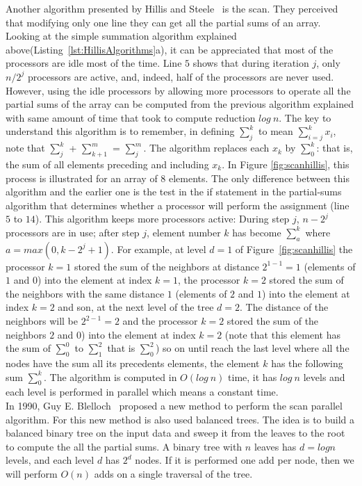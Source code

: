 \documentclass[Ingles]{ic-tese-v1}
\newcommand{\rfig}[1]{Figure~\ref{fig:#1}}
\newcommand{\rlsts}[2]{Listing~\ref{lst:#1}{#2}}
\begin{document}
Another algorithm presented by Hillis and Steele~\cite{dataparallel} is the scan. They perceived that modifying only one line they can get all the partial sums of an array.
Looking at the simple summation algorithm explained above(\rlsts{HillisAlgorithms}{a}), it can be appreciated that most of the processors are idle most of the time. Line $5$ shows that during iteration $j$, only $n/2^{j}$ processors are active, and, indeed, half of the processors are never used. However, using the idle processors by allowing more processors to operate all the partial sums of the array can be computed from the previous algorithm explained with same amount of time that took to compute reduction $log\ n$. The key to understand this algorithm is to remember, in defining $\sum_{j}^{k}$ to mean $\sum_{i=j}^{k}x_{i}$, note that $\sum_{j}^{k}$ + $\sum_{k+1}^{m}$ = $\sum_{j}^{m}$. The algorithm replaces each $x_{k}$ by $\sum_{0}^{k}$: that is, the sum of all elements preceding and including $x_{k}$. In Figure \ref{fig:scanhillis}, this process is illustrated for an array of 8 elements.
The only difference between this algorithm and the earlier one is the test in the if statement in the partial-sums algorithm that determines whether a processor will perform the assignment (line $5$ to $14$). This algorithm keeps more processors active: During step $j$, $n - 2^{j}$ processors are in use; after step $j$, element number $k$ has become $\sum_{a}^{k}$ where $a = max(0, k - 2^{j} + 1)$. For  example, at  level $d  = 1$  of \rfig{scanhillis} the processor $k = 1$ stored the sum of the neighbors at distance $2^{1-1} = 1$ (elements of $1$ and $0$) into the element at index $k = 1$, the processor $k = 2$ stored the sum of the neighbors with the same distance $1$ (elements of $2$ and $1$) into the element at index $k = 2$ and son, at the  next level of  the tree $d = 2$. The distance of the neighbors will be $2^{2-1} = 2$ and the processor $k = 2$ stored the sum of the neighbors $2$ and $0$) into the element at index $k = 2$ (note that this element has the sum of $\sum_{0}^{0}$ to $\sum_{1}^{2}$ that is $\sum_{0}^{2}$) so on until reach the last level where all the nodes have the sum all its precedents elements, the element $k$ has the following sum $\sum_{0}^{k}$. The algorithm is computed in $O(log\ n)$ time, it has $log\ n$ levels and each level is performed in parallel which means a constant time.\\
In 1990, Guy  E. Blelloch~\cite{ScanAsPrimitive} proposed a new method to perform the scan parallel algorithm. For this new method is also used balanced trees. The idea is to build a balanced binary tree on the input data and sweep it from the leaves to the root to compute the all the partial sums. A binary tree with $n$ leaves has $d = log n$ levels, and each level $d$ has $2^{d}$ nodes. If it is performed one add per node, then we will perform $O(n)$ adds on a single traversal of the tree.
\end{document}
